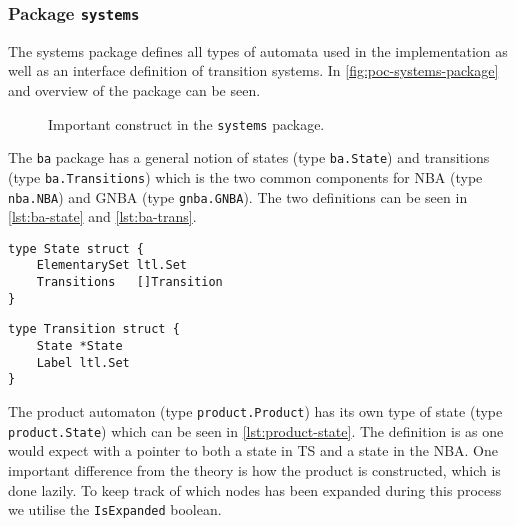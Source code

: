 \subsubsection{Package \texttt{systems}}
The systems package defines all types of automata used in the implementation as well as an interface definition of transition systems. In \autoref{fig:poc-systems-package} and overview of the package can be seen.
\begin{figure}
    \caption{Important construct in the \texttt{systems} package.}
    \label{fig:poc-systems-package}
\end{figure}
The \verb=ba= package has a general notion of states (type \verb=ba.State=) and transitions (type \verb=ba.Transitions=) which is the two common components for NBA (type \verb=nba.NBA=) and GNBA (type \verb=gnba.GNBA=). The two definitions can be seen in \autoref{lst:ba-state} and \autoref{lst:ba-trans}.


\begin{lstlisting}[language=Golang, caption={Definition of \texttt{ba.State}.}, label={lst:ba-state}, floatplacement=H]
type State struct {
    ElementarySet ltl.Set
    Transitions   []Transition
}
\end{lstlisting}

\begin{lstlisting}[language=Golang, caption={Definition of \texttt{ba.Transition}.}, label={lst:ba-trans}, floatplacement=H]
type Transition struct {
    State *State
    Label ltl.Set
}
\end{lstlisting}

The product automaton (type \verb=product.Product=) has its own type of state (type \verb=product.State=) which can be seen in \autoref{lst:product-state}. The definition is as one would expect with a pointer to both a state in TS and a state in the NBA. One important difference from the theory is how the product is constructed, which is done lazily. To keep track of which nodes has been expanded during this process we utilise the \verb=IsExpanded= boolean. 

